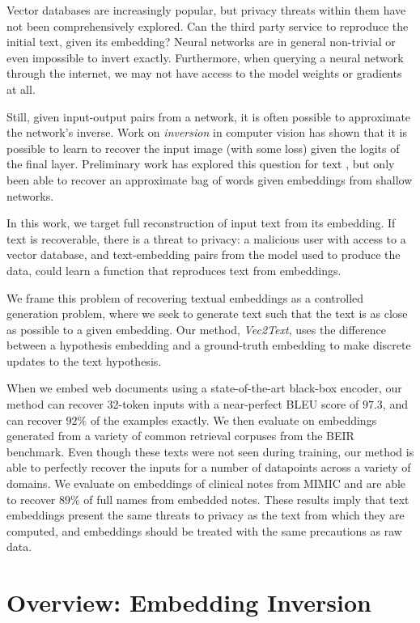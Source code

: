 \documentclass[11pt]{article}
\newcommand{\MethodName}{Vec2Text}
\begin{document}
Vector databases are increasingly popular, but privacy threats within them have not been comprehensively explored. Can the third party service to reproduce the initial text, given its embedding? Neural networks are in general non-trivial or even impossible to invert exactly. Furthermore, when querying a neural network through the internet, we may not have access to the model weights or gradients at all.

Still, given input-output pairs from a network, it is often possible to approximate the network's inverse. Work on \textit{inversion} in computer vision \cite{mahendran2014UnderstandingDI,dosovitskiy2016inverting} has shown that it is possible to learn to recover the input image (with some loss) given the logits of the final layer. Preliminary work has explored this question for text \cite{song2020informationleakage}, but only been able to recover an approximate bag of words given embeddings from shallow networks.

In this work, we target full reconstruction of input text from its embedding. If text is recoverable, there is a threat to privacy: a malicious user with access to a vector database, and text-embedding pairs from the model used to produce the data, could learn a function that reproduces text from embeddings.

We frame this problem of recovering textual embeddings as a controlled generation problem, where we seek to generate text such that the text is as close as possible to a given embedding. Our method, \textit{\MethodName}, uses the difference between a hypothesis embedding and a ground-truth embedding to make discrete updates to the text hypothesis.

When we embed web documents using a state-of-the-art black-box encoder, our method can recover 32-token inputs with a near-perfect BLEU score of $97.3$, and can recover $92\%$ of the examples exactly. We then evaluate on embeddings generated from a variety of common retrieval corpuses from the BEIR benchmark. Even though these texts were not seen during training, our method is able to perfectly recover the inputs for a number of datapoints across a variety of domains. We evaluate on embeddings of clinical notes from MIMIC and are able to recover $89\%$ of full names from embedded notes. These results imply that text embeddings present the same threats to privacy as the text from which they are computed, and embeddings should be treated with the same precautions as raw data.

\section{Overview: Embedding Inversion}
\end{document}
